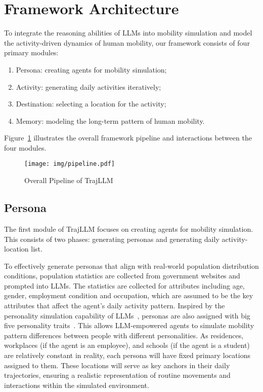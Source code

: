 \section{Framework Architecture}
To integrate the reasoning abilities of LLMs into mobility simulation and model the activity-driven dynamics of human mobility, our framework consists of four primary modules:
\begin{enumerate}
    \item Persona: creating agents for mobility simulation;
    \item Activity: generating daily activities iteratively;
    \item Destination: selecting a location for the activity;
    \item Memory: modeling the long-term pattern of human mobility.
\end{enumerate}
Figure~\ref{fig:pipeline} illustrates the overall framework pipeline and interactions between the four modules.

\begin{figure} [h]
    \centering
    \texttt{[image: img/pipeline.pdf]}
    \caption{Overall Pipeline of TrajLLM}
    \label{fig:pipeline}
\end{figure}

\subsection{Persona}
The first module of TrajLLM focuses on creating agents for mobility simulation. This consists of two phases: generating personas and generating daily activity-location list.

To effectively generate personas that align with real-world population distribution conditions, population statistics are collected from government websites and prompted into LLMs. The statistics are collected for attributes including age, gender, employment condition and occupation, which are assumed to be the key attributes that affect the agent's daily activity pattern. Inspired by the personality simulation capability of LLMs~\cite{personaLLM}, personas are also assigned with big five personality traits~\cite{big5}. This allows LLM-empowered agents to simulate mobility pattern differences between people with different personalities. As residences, workplaces (if the agent is an employee), and schools (if the agent is a student) are relatively constant in reality, each persona will have fixed primary locations assigned to them. These locations will serve as key anchors in their daily trajectories, ensuring a realistic representation of routine movements and interactions within the simulated environment.

